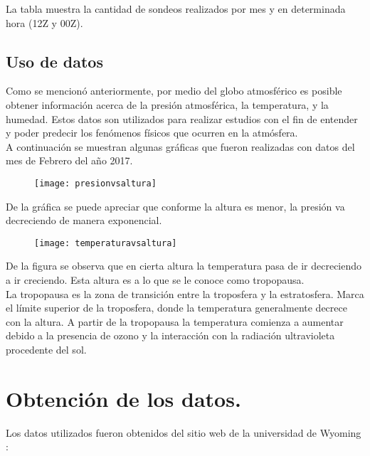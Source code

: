 \documentclass[12pt]{article}
\begin{document}
\vspace{0.5 cm}

%
La tabla muestra la cantidad de sondeos realizados por mes y en determinada hora (12Z y 00Z). 





\newpage

\subsection*{Uso de datos}

Como se mencionó anteriormente, por medio del globo atmosférico es posible obtener información acerca de la presión atmosférica, la temperatura, y la humedad. Estos datos son utilizados para realizar estudios con el fin de entender y poder predecir los fenómenos físicos que ocurren en la atmósfera.\\
A continuación se muestran algunas gráficas que fueron realizadas con datos del mes de Febrero del año 2017.

\begin{figure}[ht]
\texttt{[image: presionvsaltura]}
\centering
\end{figure}
De la gráfica se puede apreciar que conforme la altura es menor, la presión  va decreciendo de manera exponencial.


\newpage
\begin{figure}[ht]
\texttt{[image: temperaturavsaltura]}
\centering
\end{figure}

De la figura se observa que en cierta altura la temperatura pasa de ir decreciendo a ir creciendo. Esta altura es a lo que se le conoce como tropopausa. \\ 
La tropopausa es la zona de transición entre la troposfera y la estratosfera. Marca el límite superior de la troposfera, donde la temperatura generalmente decrece con la altura.
A partir de la tropopausa la temperatura comienza a aumentar debido a la presencia  de ozono y la  interacción con la radiación ultravioleta procedente del sol.
\newpage
\section*{\small Obtención de los datos.}

Los datos utilizados fueron obtenidos del sitio web de la universidad de Wyoming : %
\end{document}
